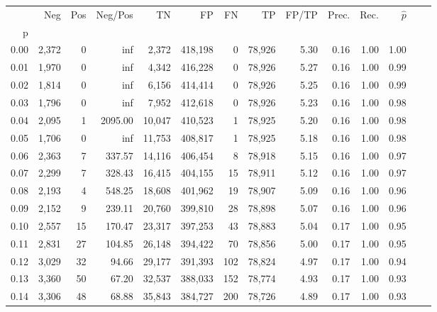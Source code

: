 \begin{tabular}{rrrrrrrrrrrrrr}
\toprule
{} &    Neg &    Pos &  Neg/Pos &       TN &       FP &      FN &      TP & FP/TP & Prec. &  Rec. & $\hat{p}$ \\
p    &        &        &          &          &          &         &         &       &       &       &           \\
\midrule
0.00 &  2,372 &      0 &      inf &    2,372 &  418,198 &       0 &  78,926 &  5.30 &  0.16 &  1.00 &      1.00 \\
0.01 &  1,970 &      0 &      inf &    4,342 &  416,228 &       0 &  78,926 &  5.27 &  0.16 &  1.00 &      0.99 \\
0.02 &  1,814 &      0 &      inf &    6,156 &  414,414 &       0 &  78,926 &  5.25 &  0.16 &  1.00 &      0.99 \\
0.03 &  1,796 &      0 &      inf &    7,952 &  412,618 &       0 &  78,926 &  5.23 &  0.16 &  1.00 &      0.98 \\
0.04 &  2,095 &      1 &  2095.00 &   10,047 &  410,523 &       1 &  78,925 &  5.20 &  0.16 &  1.00 &      0.98 \\
0.05 &  1,706 &      0 &      inf &   11,753 &  408,817 &       1 &  78,925 &  5.18 &  0.16 &  1.00 &      0.98 \\
0.06 &  2,363 &      7 &   337.57 &   14,116 &  406,454 &       8 &  78,918 &  5.15 &  0.16 &  1.00 &      0.97 \\
0.07 &  2,299 &      7 &   328.43 &   16,415 &  404,155 &      15 &  78,911 &  5.12 &  0.16 &  1.00 &      0.97 \\
0.08 &  2,193 &      4 &   548.25 &   18,608 &  401,962 &      19 &  78,907 &  5.09 &  0.16 &  1.00 &      0.96 \\
0.09 &  2,152 &      9 &   239.11 &   20,760 &  399,810 &      28 &  78,898 &  5.07 &  0.16 &  1.00 &      0.96 \\
0.10 &  2,557 &     15 &   170.47 &   23,317 &  397,253 &      43 &  78,883 &  5.04 &  0.17 &  1.00 &      0.95 \\
0.11 &  2,831 &     27 &   104.85 &   26,148 &  394,422 &      70 &  78,856 &  5.00 &  0.17 &  1.00 &      0.95 \\
0.12 &  3,029 &     32 &    94.66 &   29,177 &  391,393 &     102 &  78,824 &  4.97 &  0.17 &  1.00 &      0.94 \\
0.13 &  3,360 &     50 &    67.20 &   32,537 &  388,033 &     152 &  78,774 &  4.93 &  0.17 &  1.00 &      0.93 \\
0.14 &  3,306 &     48 &    68.88 &   35,843 &  384,727 &     200 &  78,726 &  4.89 &  0.17 &  1.00 &      0.93 \\

\end{tabular}
